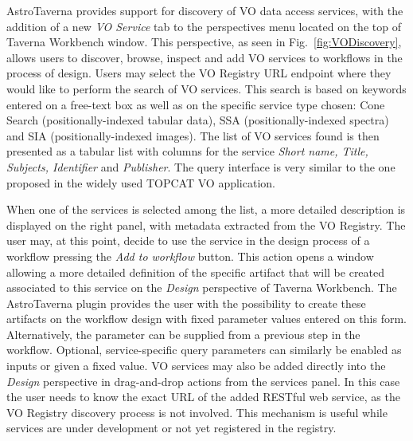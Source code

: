 \documentclass{aa}
\begin{document}
AstroTaverna provides support for discovery of VO data access services, with the addition of a new \textit{VO Service} tab to the perspectives menu located on the top of Taverna Workbench window. This perspective, as seen in Fig.~\ref{fig:VODiscovery}, allows users to discover, browse, inspect and add VO services to workflows in the process of design. Users may select the VO Registry URL endpoint where they would like to perform the search of VO services. This search is based on keywords entered on a free-text box as well as on the specific service type chosen: Cone Search (positionally-indexed tabular data), SSA (positionally-indexed spectra) and SIA (positionally-indexed images). The list of VO services found is then presented as a tabular list with columns for the service \textit{Short name, Title, Subjects, Identifier} and \textit{Publisher}. The query interface is very similar to the one proposed in the widely used TOPCAT VO application. 

When one of the services is selected among the list, a more detailed description is displayed on the right panel, with metadata extracted from the VO Registry. The user may, at this point, decide to use the service in the design process of a workflow pressing the \textit{Add to workflow} button. This action opens a window allowing a more detailed definition of the specific artifact that will be created associated to this service on the \emph{Design} perspective of Taverna Workbench. The AstroTaverna plugin provides the user with the possibility to create these artifacts on the workflow design with fixed parameter values entered on this form. Alternatively, the parameter can be supplied from a previous step in the workflow. Optional, service-specific query parameters can similarly be enabled as inputs or given a fixed value. VO services may also be added directly into the \emph{Design} perspective in drag-and-drop actions from the services panel. In this case the user needs to know the exact URL of the added RESTful web service, as the VO Registry discovery process is not involved. This mechanism is useful while services are under development or not yet registered in the registry.
\end{document}
